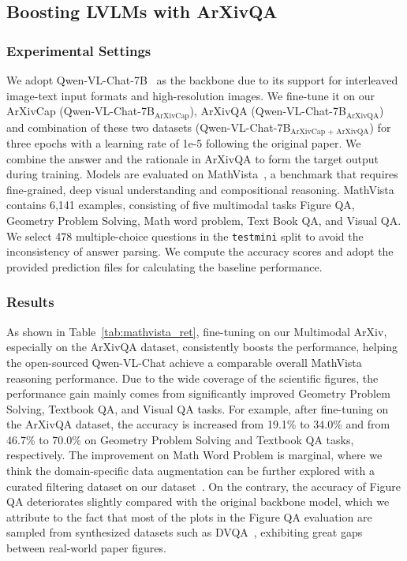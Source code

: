 
\subsection{Boosting LVLMs with ArXivQA}
\label{subsec:math_reasoning}

\subsubsection{Experimental Settings}
\label{subsubsec:exp_setting}
We adopt Qwen-VL-Chat-7B~\citep{Qwen-VL}
as the backbone due to its support for interleaved image-text input formats and high-resolution images.
We fine-tune it on our ArXivCap (Qwen-VL-Chat-7B$_\text{ArXivCap}$), ArXivQA (Qwen-VL-Chat-7B$_\text{ArXivQA}$) and combination of these two datasets (Qwen-VL-Chat-7B$_\text{ArXivCap + ArXivQA}$) for three epochs with a learning rate of 1e-5 following the original paper.
We combine the answer and the rationale in ArXivQA to form the target output during training. 
Models are evaluated on MathVista~\citep{mathvista}, a benchmark that requires fine-grained, deep visual understanding and compositional reasoning. MathVista contains 6,141 examples, consisting of five multimodal tasks Figure QA, Geometry Problem Solving, Math word problem, Text Book QA, and Visual QA. 
We select 478 multiple-choice questions in the \texttt{testmini} split to avoid the inconsistency of answer parsing. We compute the accuracy scores and adopt the provided prediction files for calculating the baseline performance.

\subsubsection{Results}

As shown in Table~\ref{tab:mathvista_ret},
fine-tuning on our Multimodal ArXiv, especially on the ArXivQA dataset, consistently boosts the performance, helping the open-sourced Qwen-VL-Chat achieve a comparable overall MathVista reasoning performance.
Due to the wide coverage of the scientific figures, the performance gain mainly comes from significantly improved Geometry Problem Solving, Textbook QA, and Visual QA tasks. For example, after fine-tuning on the ArXivQA dataset, the accuracy is increased from 19.1\% to 34.0\% and from 46.7\% to 70.0\% on Geometry Problem Solving and Textbook QA tasks, respectively.
The improvement on Math Word Problem is marginal, where we think the domain-specific data augmentation can be further explored with a curated filtering dataset on our dataset~\citep{gao2023gllava}.
On the contrary,
the accuracy of Figure QA deteriorates slightly compared with the original backbone model, which we attribute to the fact that most of the plots in the Figure QA evaluation are sampled from synthesized datasets such as DVQA~\citep{kafle2018dvqa}, exhibiting great gaps between real-world paper figures.

